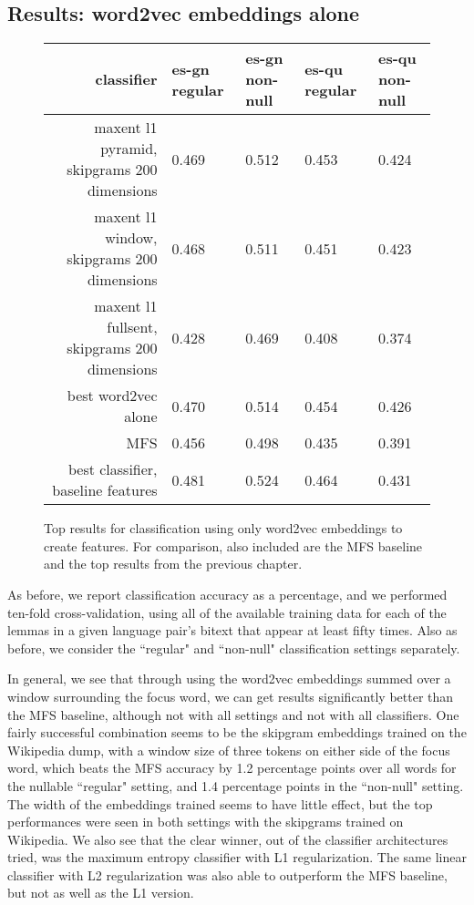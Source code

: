 \subsection{Results: word2vec embeddings alone}
\begin{figure*}
  \begin{centering}
  \begin{tabulary}{\textwidth}{|R|L|L|L|L|}
    \hline
    classifier & es-gn regular & es-gn non-null & es-qu regular & es-qu non-null \\
    \hline
    maxent l1 pyramid, skipgrams 200 dimensions & 0.469 & 0.512 & 0.453 & 0.424 \\
    \hline
    maxent l1 window, skipgrams 200 dimensions & 0.468 & 0.511 & 0.451 & 0.423 \\
    \hline
    maxent l1 fullsent, skipgrams 200 dimensions & 0.428 & 0.469 & 0.408 & 0.374 \\
    \hline
    best word2vec alone & 0.470 & 0.514 & 0.454 & 0.426 \\
    \hline
    MFS    & 0.456 & 0.498 & 0.435 & 0.391 \\
    \hline
    best classifier, baseline features & 0.481 & 0.524 & 0.464 & 0.431 \\
    \hline
  \end{tabulary}
  \end{centering}
  \caption{Top results for classification using only word2vec embeddings to
  create features. For comparison, also included are the MFS baseline and the
  top results from the previous chapter.}
  \label{fig:word2vec-alone-results}
\end{figure*}

As before, we report classification accuracy
as a percentage, and we performed ten-fold cross-validation, using all of the
available training data for each of the lemmas in a given language pair's
bitext that appear at least fifty times. Also as before, we consider the
``regular" and ``non-null" classification settings separately.

In general, we see that through using the word2vec embeddings summed over a
window surrounding the focus word, we can get results significantly better than
the MFS baseline, although not with all settings and not with all classifiers.
One fairly successful combination seems to be the skipgram embeddings trained
on the Wikipedia dump, with a window size of three tokens on either side of the
focus word, which beats the MFS accuracy by 1.2 percentage points over all
words for the nullable ``regular" setting, and 1.4 percentage points in the
``non-null" setting. The width of the embeddings trained seems to have little
effect, but the top performances were seen in both settings with the skipgrams
trained on Wikipedia. We also see that the clear winner, out of the classifier
architectures tried, was the maximum entropy classifier with L1 regularization.
The same linear classifier with L2 regularization was also able to outperform
the MFS baseline, but not as well as the L1 version.

